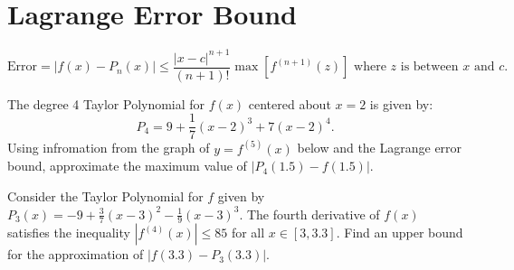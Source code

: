 \documentclass{exam}
\begin{document}
\section*{Lagrange Error Bound} 

\begin{tcolorbox}[title=Recall: \textit{Lagrange Error Bound},title filled,colframe=black,sharpish corners,width=\linewidth]
    \[\text{Error}=\left|f(x)-P_n(x)\right|\le\frac{|x-c|^{n+1}}{(n+1)!}\max\left[f^{(n+1)}(z)\right]\text{ where }z\text{ is between }x\text{ and }c.\]
\end{tcolorbox}

\begin{questions} 
    \question The degree 4 Taylor Polynomial for $f(x)$ centered about $x=2$ is given by:
    \[P_4=9+\frac{1}{7}(x-2)^3+7(x-2)^4 .\]
    Using infromation from the graph of $y=f^{(5)}(x)$ below and the Lagrange error bound, approximate the maximum value of $\left|P_4(1.5)-f(1.5)\right|$.



    \question Consider the Taylor Polynomial for $f$ given by $P_3(x)=-9+\frac{3}{7}(x-3)^2-\frac{1}{9}(x-3)^3$. The fourth derivative of $f(x)$ satisfies the inequality $\displaystyle\left|f^{(4)}(x)\right|\le85$ for all $x\in[3,3.3]$. Find an upper bound for the approximation of $\displaystyle\left|f(3.3)-P_3(3.3)\right|$.
    

   
    
\end{questions}
\end{document}
